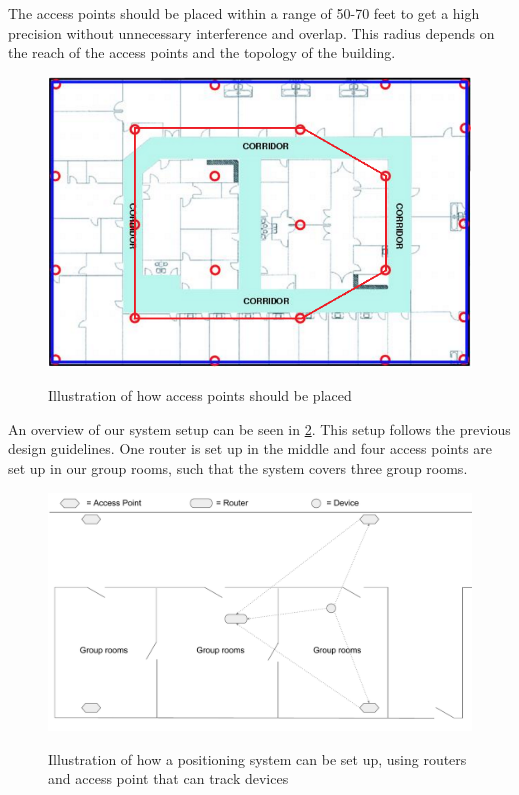 The access points should be placed within a range of 50-70 feet to get a high precision without unnecessary interference and overlap\cite{access_point_range}. This radius depends on the reach of the access points and the topology of the building.

\begin{figure}[H]
	\centering
	\includegraphics[scale=0.5]{graphics/access_placement.png}
	\label{fig:access_placement}
	\caption{Illustration of how access points should be placed\cite{access_point_placement}}
\end{figure}

An overview of our system setup can be seen in \cref{fig:OwnSetup}. This setup follows the previous design guidelines. One router is set up in the middle and four access points are set up in our group rooms, such that the system covers three group rooms.

\begin{figure}[H]
	\centering
	\includegraphics[scale=0.5]{graphics/Router-AccessPoint_Setup.pdf}
	\label{fig:OwnSetup}
	\caption{Illustration of how a positioning system can be set up, using routers and access point that can track devices}
\end{figure}

